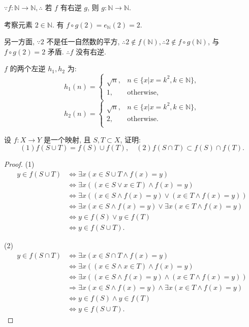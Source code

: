 \documentclass{ctexart}
\begin{document}
\begin{solution}
    $\because f:\mathbb{N}\to\mathbb{N},\therefore$ 若 $f$ 有右逆 $g$, 则 $g:\mathbb{N}\to\mathbb{N}$.

    考察元素 $2\in\mathbb{N}$. 有 $f\circ g(2)=e_{\mathbb{N}}(2)=2$.

    另一方面, $\because 2$ 不是任一自然数的平方, $\therefore2\notin f(\mathbb{N}),\therefore2\notin f\circ g(\mathbb{N})$, 与 $f\circ g(2)=2$ 矛盾. $\therefore f$ 没有右逆.

    $f$ 的两个左逆 $h_1,h_2$ 为:
    \[h_1(n)=\begin{cases}
        \sqrt{n}, & n\in\{x|x=k^2,k\in\mathbb{N}\}, \\
        1, & \text{otherwise}, \\
    \end{cases}\]
    \[h_2(n)=\begin{cases}
        \sqrt{n}, & n\in\{x|x=k^2,k\in\mathbb{N}\}, \\
        2, & \text{otherwise}. \\
    \end{cases}\]
\end{solution}
\begin{exercise}[5.3]
    设 $f:X\to Y$ 是一个映射, 且 $S,T\subset X$, 证明:
    \[(1)f(S\cup T)=f(S)\cup f(T),\quad(2)f(S\cap T)\subset f(S)\cap f(T).\]
\end{exercise}
\begin{proof}
    (1)
    \begin{align*}
        y\in f(S\cup T) & \Leftrightarrow\exists x(x\in S\cup T\land f(x)=y) \\
        & \Leftrightarrow\exists x((x\in S\vee x\in T)\land f(x)=y) \\
        & \Leftrightarrow\exists x((x\in S\land f(x)=y)\vee(x\in T\land f(x)=y)) \\
        & \Leftrightarrow\exists x(x\in S\land f(x)=y)\vee\exists x(x\in T\land f(x)=y) \\
        & \Leftrightarrow y\in f(S)\vee y\in f(T) \\
        & \Leftrightarrow y\in f(S\cup T).
    \end{align*}

    (2)
    \begin{align*}
        y\in f(S\cap T) & \Leftrightarrow\exists x(x\in S\cap T\land f(x)=y) \\
        & \Leftrightarrow\exists x((x\in S\land x\in T)\land f(x)=y) \\
        & \Leftrightarrow\exists x((x\in S\land f(x)=y)\land(x\in T\land f(x)=y)) \\
        & \Rightarrow\exists x(x\in S\land f(x)=y)\land\exists x(x\in T\land f(x)=y) \\
        & \Leftrightarrow y\in f(S)\land y\in f(T) \\
        & \Leftrightarrow y\in f(S\cup T).
    \end{align*}
\end{proof}
\end{document}
